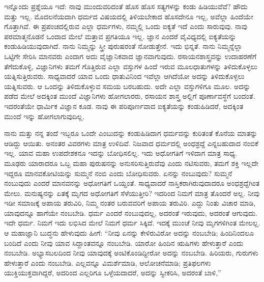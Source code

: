 ಇನ್ನೊಂದು ಪ್ರಶ್ನೆಯೂ ಇದೆ: ನಾವು ಮುಂದುವರಿದಂತೆ ಹೊಸ ಹೊಸ ಸತ್ಯಗಳನ್ನು ಕಂಡು ಹಿಡಿಯುವೆವೆ? ಹೌದು ಮತ್ತು ಇಲ್ಲ. ಮೊದಲನೆಯದಾಗಿ ಧರ್ಮದ ವಿಷಯದಲ್ಲಿ ತಿಳಿಯಬೇಕಾದ ಹೊಸದೇನೂ ಇಲ್ಲ, ಅವೆಲ್ಲಾ ಹಿಂದೆಯೇ ಗೊತ್ತಾಗಿವೆ. ಈ ಪ್ರಪಂಚದಲ್ಲಿರುವ ಎಲ್ಲಾ ಧರ್ಮಗಳು, ನಮ್ಮಲ್ಲಿ ಒಂದು ಐಕ್ಯತೆ ಇದೆ ಎಂದು ಸಾರುವುವು. ನಾವು ಪರಮಾತ್ಮನೊಡನೆ ಒಂದಾದ ಮೇಲೆ ಮತ್ತಾವ ಪ್ರಗತಿಯೂ ಇಲ್ಲ. ಜ್ಞಾನ ಎಂದರೆ ವೈವಿಧ್ಯದಲ್ಲಿ ಐಕ್ಯತೆಯನ್ನು ಕಂಡುಹಿಡಿಯುವುದಾಗಿದೆ. ನಾನು ನಿಮ್ಮನ್ನು ಸ್ತ್ರೀ ಪುರುಷರಂತೆ ನೋಡುತ್ತೇನೆ. ಇದು ಭಿನ್ನತೆ. ನಾನು ನಿಮ್ಮನ್ನೆಲ್ಲಾ ಒಟ್ಟಿಗೇ ಸೇರಿಸಿ ಮಾನವರು ಎಂದಾಗ ಅದು ವೈಜ್ಞಾನಿಕವಾದ ಜ್ಞಾನವಾಗುವುದು. ರಸಾಯನಶಾಸ್ತ್ರವನ್ನು ಉದಾಹರಣೆಗೆ ತೆಗೆದುಕೊಳ್ಳಿ, ವಿಜ್ಞಾನಿಗಳು ತಮಗೆ ಗೊತ್ತಿರುವ ಎಲ್ಲಾ ವಸ್ತುಗಳ ಹಿಂದೆ ಇರುವ ಮೂಲಧಾತುಗಳನ್ನು ತಿಳಿದುಕೊಳ್ಳಲು ಯತ್ನಿಸುತ್ತಿರುವರು. ಸಾಧ್ಯವಾದರೆ ಯಾವ ಒಂದು ಧಾತುವಿನಿಂದ ಇವೆಲ್ಲಾ ಆಗಿದೆಯೋ ಅದನ್ನು ತಿಳಿದುಕೊಳ್ಳಲು ಯತ್ನಿಸುವರು. ಆ ಒಂದನ್ನು ತಿಳಿದುಕೊಳ್ಳುವ ಸಮಯ ಬರಬಹುದು. ಅದೇ ಎಲ್ಲಾ ವಸ್ತುಗಳಿಗೂ ಮೂಲ. ಅದನ್ನು ಪಡೆದ ಮೇಲೆ ಅದಕ್ಕಿಂತ ಮುಂದೆ ವಿಜ್ಞಾನಿಗಳು ಹೋಗಲಾರರು, ರಸಾಯನ ಶಾಸ್ತ್ರ ಅಲ್ಲಿಗೆ ಪೂರ್ಣಾವಸ್ಥೆಗೆ ಬಂದಂತೆ. ಇದರಂತೆಯೇ ಧಾರ್ಮಿಕ ವಿಜ್ಞಾನ ಕೂಡ. ನಾವು ಈ ಪರಿಪೂರ್ಣವಾದ ಐಕ್ಯತೆಯನ್ನು ಕಂಡುಹಿಡಿದರೆ, ಅದಕ್ಕಿಂತ ಮುಂದೆ ಇನ್ನು ಹೋಗಲಾಗುವುದಿಲ್ಲ.

ನಾನು ಮತ್ತು ನನ್ನ ತಂದೆ ಇಬ್ಬರೂ ಒಂದೇ ಎಂಬುದನ್ನು ಕಂಡುಹಿಡಿದಾಗ ಧರ್ಮವನ್ನು ಕುರಿತಂತೆ ಕೊನೆಯ ಮಾತನ್ನು ಆಡಿದ್ದು ಆಯಿತು. ಅನಂತರ ವಿವರಗಳು ಮಾತ್ರ ಉಳಿದಿವೆ. ನಿಜವಾದ ಧರ್ಮದಲ್ಲಿ ಅಂಧಶ್ರದ್ದೆ ಎನ್ನಬಹುದಾದ ನಂಬಿಕೆ ಇಲ್ಲ. ಯಾವ ಮಹಾ ಉಪದೇಶಕನೂ ಇದನ್ನು ಬೋಧಿಸಲಿಲ್ಲ. ಇದು ಅಧೋಗತಿಗೆ ಇಳಿದಾಗ ಮಾತ್ರ ಸಾಧ್ಯ. ಮೂಢರು ಯಾರಾದರೂ ಒಬ್ಬ ಮಹಾ ಪುರುಷನನ್ನು ಅನುಸರಿಸುತ್ತಿರುವೆವು ಎಂದು ನಟಿಸುವರು, ತಮಗೆ ಶಕ್ತಿ ಇಲ್ಲದೇ ಇದ್ದರೂ ಮಾನವಕೋಟಿಯನ್ನು ಸುಮ್ಮನೆ ನಂಬಿ ಎಂದು ಬೋಧಿಸುವರು. ಏನನ್ನು ನಂಬುವುದು? ಸುಮ್ಮನೆ ನಂಬುವುದು ಎಂದರೆ ಮಾನವನನ್ನು ಅಧೋಗತಿಗೆ ಒಯ್ದಂತೆ. ಸಾಧ್ಯವಾದರೆ ನಾಸ್ತಿಕರಾಗಿರುವುದಾದರೂ ಅಂಧಶ್ರದ್ದೆಗಿಂತ ಮೇಲು. ಮನುಷ್ಯನನ್ನು ಏತಕ್ಕೆ ಮೃಗದ ಅಧೋಗತಿಗೆ ಸೆಳೆಯುತ್ತೀರಿ? ಇದರಿಂದ ನಿಮಗೆ ಮಾತ್ರ ತೊಂದರೆ ಅಲ್ಲ. ನೀವು ಇಡೀ ಸಮಾಜಕ್ಕೆ ಅಪಾಯ ತರುವಿರಿ, ನಿಮ್ಮ ನಂತರ ಬರುವವರಿಗೆ ಅಪಾಯ ತರುವಿರಿ. ಎದ್ದು ನಿಂತು ವಿಚಾರ ಮಾಡಿ, ಯಾವುದನ್ನೂ ಹಾಗೆಯೇ ನಂಬಬೇಡಿ. ಧರ್ಮ ಎಂದರೆ ನಂಬುವುದಲ್ಲ, ಅದರಂತೆ ಇರುವುದು, ಅದರಂತೆ ಆಗುವುದು. ಇದೇ ಧರ್ಮ. ನಿಮಗೆ ಇದು ಲಭಿಸಿದ ಮೇಲೆ ನಿಮಗೆ ಧರ್ಮ ಸಿಕ್ಕಿದೆ. ಇದಕ್ಕೆ ಮುಂಚೆ ನೀವು ಮೃಗಗಳಿಗಿಂತ ಮೇಲಲ್ಲ. ಆ ಮಹಾಜ್ಞಾನಿ ಬುದ್ಧನು ಹೇಳುವುದು ಹೀಗೆ: “ನೀವು ಏನನ್ನು ಕೇಳಿರುವಿರೋ ಅದನ್ನು ನಂಬಬೇಡಿ; ಹಿಂದಿನಿಂದಲೂ ಬಂದಿದೆ ಎಂದು ನೀವು ಯಾವ ಸಿದ್ದಾಂತವನ್ನೂ ನಂಬಬೇಡಿ. ಯಾರೋ ಹಿಂದಿನ ಋಷಿಗಳು ಹೇಳುತ್ತಾರೆ ಎಂದು ನಂಬಬೇಡಿ. ಅಭ್ಯಾಸಬಲದಿಂದ ನೀವು ಯಾವುದಕ್ಕೆ ಅಂಟಿಕೊಂಡಿದ್ದೀರೋ ಅದನ್ನು ನಂಬಬೇಡಿ. ಹಿರಿಯರು, ಗುರುಗಳು ಹೇಳುತ್ತಾರೆ ಎಂದು ನಂಬಬೇಡಿ. ಎಲ್ಲವನ್ನೂ ವಿಮರ್ಶೆಮಾಡಿ, ಆಲೋಚನೆಮಾಡಿ; ಪ್ರತಿಫಲಗಳು ಯುಕ್ತಿಯುಕ್ತವಾಗಿದ್ದರೆ, ಅದರಿಂದ ಎಲ್ಲರಿಗೂ ಒಳ್ಳೆಯದಾದರೆ, ಅದನ್ನು ಸ್ವೀಕರಿಸಿ, ಅದರಂತೆ ಬಾಳಿ,''

